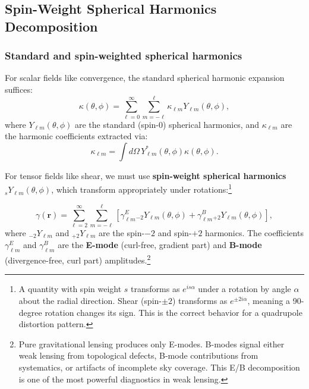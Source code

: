 \subsection{Spin-Weight Spherical Harmonics Decomposition}

\subsubsection{Standard and spin-weighted spherical harmonics}

For scalar fields like convergence, the standard spherical harmonic expansion suffices:
\begin{equation}
\kappa(\theta, \phi) = \sum_{\ell=0}^\infty \sum_{m=-\ell}^\ell \kappa_{\ell m} Y_{\ell m}(\theta, \phi),
\label{eq:scalar_harmonic_expansion}
\end{equation}
where $Y_{\ell m}(\theta, \phi)$ are the standard (spin-0) spherical harmonics, and $\kappa_{\ell m}$ are the harmonic coefficients
extracted via:
\begin{equation}
\kappa_{\ell m} = \int d\Omega \, Y^*_{\ell m}(\theta, \phi) \kappa(\theta, \phi).
\label{eq:scalar_coefficients}
\end{equation}

For tensor fields like shear, we must use \textbf{spin-weight spherical harmonics} ${}_s Y_{\ell m}(\theta, \phi)$, which transform
appropriately under rotations:\footnote{A quantity with spin weight $s$ transforms as $e^{is\alpha}$ under a rotation by angle $\alpha$
about the radial direction. Shear (spin-$\pm 2$) transforms as $e^{\pm 2i\alpha}$, meaning a 90-degree rotation changes its sign.
This is the correct behavior for a quadrupole distortion pattern.}

\begin{equation}
\gamma(\mathbf{r}) = \sum_{\ell=2}^\infty \sum_{m=-\ell}^\ell \left[\gamma^E_{\ell m} {}_{-2}Y_{\ell m}(\theta, \phi) + 
\gamma^B_{\ell m} {}_{+2}Y_{\ell m}(\theta, \phi)\right],
\label{eq:shear_harmonic_expansion}
\end{equation}
where ${}_{-2}Y_{\ell m}$ and ${}_{+2}Y_{\ell m}$ are the spin-$-2$ and spin-$+2$ harmonics. The coefficients $\gamma^E_{\ell m}$ and
$\gamma^B_{\ell m}$ are the \textbf{E-mode} (curl-free, gradient part) and \textbf{B-mode} (divergence-free, curl part)
amplitudes.\footnote{Pure gravitational lensing produces only E-modes. B-modes signal either weak lensing from topological defects,
B-mode contributions from systematics, or artifacts of incomplete sky coverage. This E/B decomposition is one of the most powerful
diagnostics in weak lensing.}

